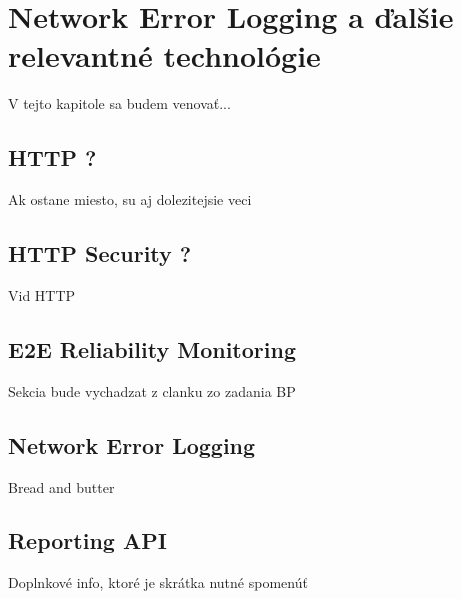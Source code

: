 \chapter{Network Error Logging a ďalšie relevantné technológie}
\label{nel-and-related-technologies}

V tejto kapitole sa budem venovať...

\section{HTTP ?}

Ak ostane miesto, su aj dolezitejsie veci

\section{HTTP Security ?}

Vid HTTP

\section{E2E Reliability Monitoring}

Sekcia bude vychadzat z clanku zo zadania BP \cite{nel-client-side-measurement-e2e-reliability}

\section{Network Error Logging}

Bread and butter \cite{W3C-NEL}

\section{Reporting API}

Doplnkové info, ktoré je skrátka nutné spomenúť \cite{W3C-reporting-api}